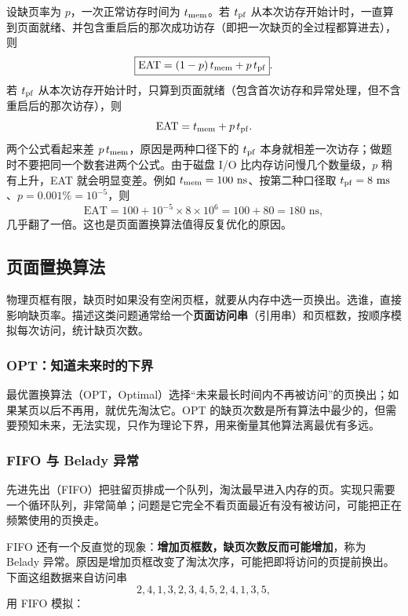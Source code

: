 设缺页率为 $p$，一次正常访存时间为 $t_{\rm mem}$。若 $t_{\rm pf}$ 从本次访存开始计时，一直算到页面就绪、并包含重启后的那次成功访存（即把一次缺页的全过程都算进去），则
\[
\boxed{\mathrm{EAT}=(1-p)\,t_{\rm mem}+p\,t_{\rm pf}}.
\]
若 $t_{\rm pf}$ 从本次访存开始计时，只算到页面就绪（包含首次访存和异常处理，但不含重启后的那次访存），则
\[
\mathrm{EAT}=t_{\rm mem}+p\,t_{\rm pf}.
\]
两个公式看起来差 $p\,t_{\rm mem}$，原因是两种口径下的 $t_{\rm pf}$ 本身就相差一次访存；做题时不要把同一个数套进两个公式。由于磁盘 I/O 比内存访问慢几个数量级，$p$ 稍有上升，EAT 就会明显变差。例如 $t_{\rm mem}=100\text{ ns}$、按第二种口径取 $t_{\rm pf}=8\text{ ms}$、$p=0.001\%=10^{-5}$，则
\[
\mathrm{EAT}=100+10^{-5}\times 8\times10^{6}=100+80=180\text{ ns},
\]
几乎翻了一倍。这也是页面置换算法值得反复优化的原因。

\subsection{页面置换算法}

物理页框有限，缺页时如果没有空闲页框，就要从内存中选一页换出。选谁，直接影响缺页率。描述这类问题通常给一个\textbf{页面访问串}（引用串）和页框数，按顺序模拟每次访问，统计缺页次数。

\subsubsection{OPT：知道未来时的下界}

最优置换算法（OPT，Optimal）选择“未来最长时间内不再被访问”的页换出；如果某页以后不再用，就优先淘汰它。OPT 的缺页次数是所有算法中最少的，但需要预知未来，无法实现，只作为理论下界，用来衡量其他算法离最优有多远。

\subsubsection{FIFO 与 Belady 异常}

先进先出（FIFO）把驻留页排成一个队列，淘汰最早进入内存的页。实现只需要一个循环队列，非常简单；问题是它完全不看页面最近有没有被访问，可能把正在频繁使用的页换走。

FIFO 还有一个反直觉的现象：\textbf{增加页框数，缺页次数反而可能增加}，称为 Belady 异常。原因是增加页框改变了淘汰次序，可能把即将访问的页提前换出。下面这组数据来自访问串
\[
2,4,1,3,2,3,4,5,2,4,1,3,5,
\]
用 FIFO 模拟：

\begin{center}
\end{center}

